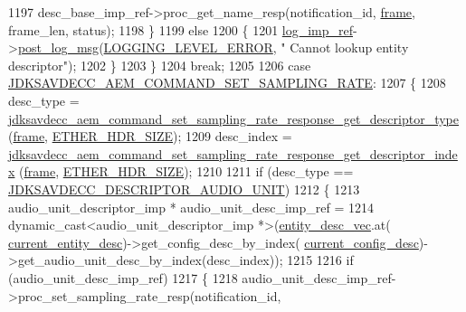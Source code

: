 \begin{DoxyCode}
{{1197             desc\_base\_imp\_ref->proc\_get\_name\_resp(notification\_id, \hyperlink{gst__avb__playbin_8c_ac8e710e0b5e994c0545d75d69868c6f0}{frame}, frame\_len, status);
1198         \}
1199         \textcolor{keywordflow}{else}
1200         \{
1201             \hyperlink{namespaceavdecc__lib_acbe3e2a96ae6524943ca532c87a28529}{log\_imp\_ref}->\hyperlink{classavdecc__lib_1_1log_a68139a6297697e4ccebf36ccfd02e44a}{post\_log\_msg}(\hyperlink{namespaceavdecc__lib_a501055c431e6872ef46f252ad13f85cdaf2c4481208273451a6f5c7bb9770ec8a}{LOGGING\_LEVEL\_ERROR}, \textcolor{stringliteral}{"
      Cannot lookup entity descriptor"});
1202         \}
1203     \}
1204     \textcolor{keywordflow}{break};
1205 
1206     \textcolor{keywordflow}{case} \hyperlink{group__command_ga65253366a1e39d922ec9e1ef07ff6af7}{JDKSAVDECC\_AEM\_COMMAND\_SET\_SAMPLING\_RATE}:
1207     \{
1208         desc\_type = 
      \hyperlink{group__command__set__sampling__rate__response_ga7ef41da0b00b554d79a79560a39212c5}{jdksavdecc\_aem\_command\_set\_sampling\_rate\_response\_get\_descriptor\_type}
      (\hyperlink{gst__avb__playbin_8c_ac8e710e0b5e994c0545d75d69868c6f0}{frame}, \hyperlink{namespaceavdecc__lib_a6c827b1a0d973e18119c5e3da518e65ca9512ad9b34302ba7048d88197e0a2dc0}{ETHER\_HDR\_SIZE});
1209         desc\_index = 
      \hyperlink{group__command__set__sampling__rate__response_ga805bbca5c29f5e4fe9835ab533a32d66}{jdksavdecc\_aem\_command\_set\_sampling\_rate\_response\_get\_descriptor\_index}
      (\hyperlink{gst__avb__playbin_8c_ac8e710e0b5e994c0545d75d69868c6f0}{frame}, \hyperlink{namespaceavdecc__lib_a6c827b1a0d973e18119c5e3da518e65ca9512ad9b34302ba7048d88197e0a2dc0}{ETHER\_HDR\_SIZE});
1210 
1211         \textcolor{keywordflow}{if} (desc\_type == \hyperlink{group__descriptor_gab23787344ad4773f6486ee9d4bfa4cd2}{JDKSAVDECC\_DESCRIPTOR\_AUDIO\_UNIT})
1212         \{
1213             audio\_unit\_descriptor\_imp * audio\_unit\_desc\_imp\_ref =
1214                 \textcolor{keyword}{dynamic\_cast<}audio\_unit\_descriptor\_imp *\textcolor{keyword}{>}(\hyperlink{classavdecc__lib_1_1end__station__imp_a72edab41bc56e3c1757944a7df188a3d}{entity\_desc\_vec}.at(
      \hyperlink{classavdecc__lib_1_1end__station__imp_afd78c89df26ba7641e1adb764c0e827d}{current\_entity\_desc})->get\_config\_desc\_by\_index(
      \hyperlink{classavdecc__lib_1_1end__station__imp_a60b1af40d35e8a86b0082c54ab6cb6a8}{current\_config\_desc})->get\_audio\_unit\_desc\_by\_index(desc\_index));
1215 
1216             \textcolor{keywordflow}{if} (audio\_unit\_desc\_imp\_ref)
1217             \{
1218                 audio\_unit\_desc\_imp\_ref->proc\_set\_sampling\_rate\_resp(notification\_id, 
}}
\end{DoxyCode}

